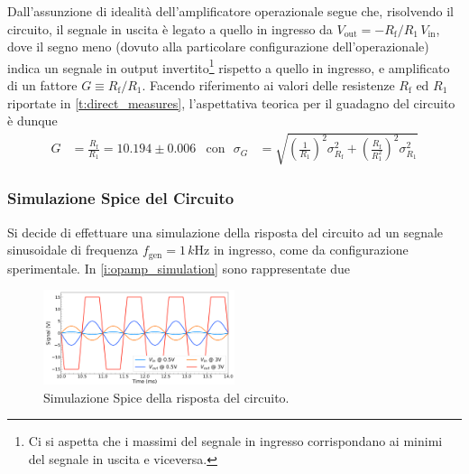 \documentclass[a4paper,11pt]{article} %
\begin{document}
\noindent Dall'assunzione di idealità dell'amplificatore operazionale segue che, risolvendo il circuito, il segnale in
uscita è legato a quello in ingresso da $V_{\text{out}} = - R_{\text{f}} / R_{1} \, V_{\text{in}}$, dove il segno meno
(dovuto alla particolare configurazione dell'operazionale) indica un segnale in output invertito\footnote{Ci si aspetta
che i massimi del segnale in ingresso corrispondano ai minimi del segnale in uscita e viceversa.} rispetto a quello in
ingresso, e amplificato di un fattore $G \equiv R_{\text{f}} / R_{1}$. Facendo riferimento ai valori
delle resistenze $R_{\text{f}}$ ed $R_1$ riportate in \autoref{t:direct_measures}, l'aspettativa teorica per il guadagno
del circuito è dunque 
\begin{align}\label{e:guadagno}
	G&=\frac{R_{\text{f}}}{R_{1}} = 10.194 \pm 0.006
	&
	\text{con   }\,\,\sigma_{G}&=\sqrt{	\left(	\frac{	1	}{	R_{1}	}	\right)^2	\sigma_{R_{\text{f}}}^2	
	+	\left(	\frac{	R_{\text{f}}	}{	R_{1}^2	}	\right)^2\sigma_{R_{1}}^2	}
\end{align}


\subsubsection{Simulazione Spice del Circuito}\label{s:spice} 

Si decide di effettuare una simulazione della risposta del circuito ad un segnale sinusoidale di frequenza
$f_{\text{gen}}=1\,\si{k\hertz}$ in ingresso, come da configurazione sperimentale. In \autoref{i:opamp_simulation} sono
rappresentate due 

\begin{figure}
	\centering
	\includegraphics[width=0.5\textwidth]{../Plots/Report_Plots/opamp_spice_py.png}
	\caption{\footnotesize Simulazione Spice della risposta del circuito.}
	\label{i:opamp_simulation}
\end{figure}
\end{document}
